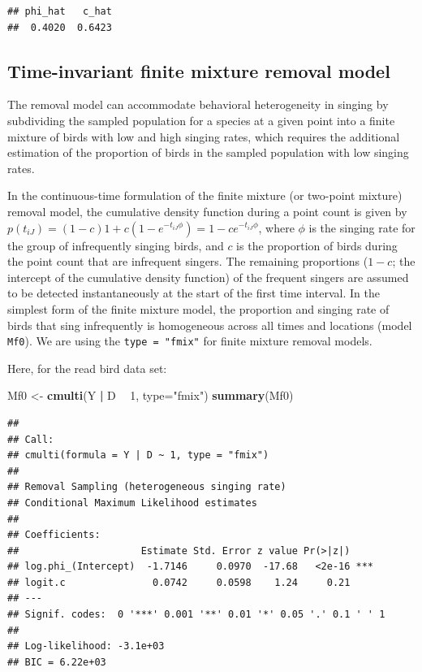 \documentclass[12pt,]{book}
\newenvironment{Shaded}{\begin{snugshade}}{\end{snugshade}}
\newcommand{\DataTypeTok}[1]{\textcolor[rgb]{0.13,0.29,0.53}{#1}}
\newcommand{\DecValTok}[1]{\textcolor[rgb]{0.00,0.00,0.81}{#1}}
\newcommand{\KeywordTok}[1]{\textcolor[rgb]{0.13,0.29,0.53}{\textbf{#1}}}
\newcommand{\NormalTok}[1]{#1}
\newcommand{\OperatorTok}[1]{\textcolor[rgb]{0.81,0.36,0.00}{\textbf{#1}}}
\newcommand{\StringTok}[1]{\textcolor[rgb]{0.31,0.60,0.02}{#1}}
\begin{document}
\begin{verbatim}
## phi_hat   c_hat 
##  0.4020  0.6423
\end{verbatim}

\hypertarget{time-invariant-finite-mixture-removal-model}{%
\subsection{Time-invariant finite mixture removal model}\label{time-invariant-finite-mixture-removal-model}}

The removal model can accommodate behavioral heterogeneity in singing by subdividing the
sampled population for a species at a given point into a finite mixture of birds with low and
high singing rates, which requires the additional estimation of the proportion of birds in the
sampled population with low singing rates.

In the continuous-time formulation of the finite mixture (or two-point mixture) removal model,
the cumulative density function during a point count is given by
\(p(t_{iJ}) = (1 - c) 1 + c (1 - e^{-t_{iJ} \phi}) = 1 - c e^{-t_{iJ} \phi}\), where
\(\phi\) is the singing rate for the group of infrequently singing birds, and \(c\) is the
proportion of birds during the point count that are infrequent singers. The remaining
proportions (\(1 - c\); the intercept of the cumulative density function) of the frequent
singers are assumed to be detected instantaneously at the start of the first time interval.
In the simplest form of the finite mixture model, the proportion and singing rate of birds
that sing infrequently is homogeneous across all times and locations (model \texttt{Mf0}).
We are using the \texttt{type\ =\ "fmix"} for finite mixture removal models.

Here, for the read bird data set:

\begin{Shaded}
\begin{Highlighting}[]
\NormalTok{Mf0 <-}\StringTok{ }\KeywordTok{cmulti}\NormalTok{(Y }\OperatorTok{|}\StringTok{ }\NormalTok{D }\OperatorTok{~}\StringTok{ }\DecValTok{1}\NormalTok{, }\DataTypeTok{type=}\StringTok{"fmix"}\NormalTok{)}
\KeywordTok{summary}\NormalTok{(Mf0)}
\end{Highlighting}
\end{Shaded}

\begin{verbatim}
## 
## Call:
## cmulti(formula = Y | D ~ 1, type = "fmix")
## 
## Removal Sampling (heterogeneous singing rate)
## Conditional Maximum Likelihood estimates
## 
## Coefficients:
##                     Estimate Std. Error z value Pr(>|z|)    
## log.phi_(Intercept)  -1.7146     0.0970  -17.68   <2e-16 ***
## logit.c               0.0742     0.0598    1.24     0.21    
## ---
## Signif. codes:  0 '***' 0.001 '**' 0.01 '*' 0.05 '.' 0.1 ' ' 1 
## 
## Log-likelihood: -3.1e+03 
## BIC = 6.22e+03
\end{verbatim}
\end{document}
